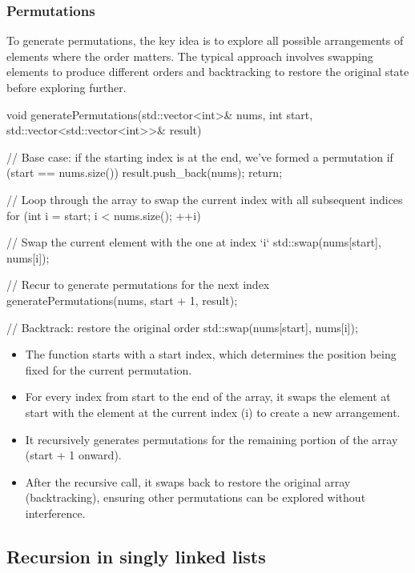 \documentclass{report}
\begin{document}
\subsubsection{Permutations}
\bigbreak \noindent 
To generate permutations, the key idea is to explore all possible arrangements of elements where the order matters. The typical approach involves swapping elements to produce different orders and backtracking to restore the original state before exploring further.
\bigbreak \noindent 
\begin{cppcode}
    void generatePermutations(std::vector<int>& nums, int start, std::vector<std::vector<int>>& result) {
        // Base case: if the starting index is at the end, we've formed a permutation
        if (start == nums.size()) {
            result.push_back(nums);
            return;
        }

        // Loop through the array to swap the current index with all subsequent indices
        for (int i = start; i < nums.size(); ++i) {
            // Swap the current element with the one at index `i`
            std::swap(nums[start], nums[i]);

            // Recur to generate permutations for the next index
            generatePermutations(nums, start + 1, result);

            // Backtrack: restore the original order
            std::swap(nums[start], nums[i]);
        }
    }
\end{cppcode}
\bigbreak \noindent 
\begin{itemize}
    \item The function starts with a start index, which determines the position being fixed for the current permutation.
    \item For every index from start to the end of the array, it swaps the element at start with the element at the current index (i) to create a new arrangement.
    \item It recursively generates permutations for the remaining portion of the array (start + 1 onward).
    \item After the recursive call, it swaps back to restore the original array (backtracking), ensuring other permutations can be explored without interference.
\end{itemize}







\pagebreak 
\subsection{Recursion in singly linked lists}
\bigbreak \noindent 
\end{document}
